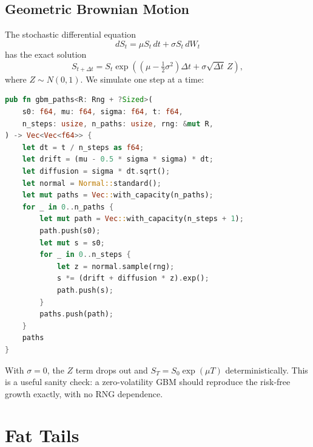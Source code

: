 \subsection{Geometric Brownian Motion}


The stochastic differential equation
\[
dS_t = \mu S_t\, dt + \sigma S_t\, dW_t
\]
has the exact solution
\[
S_{t+\Delta t} = S_t \exp\!\left(\left(\mu - \tfrac{1}{2}\sigma^2\right)\Delta t + \sigma\sqrt{\Delta t}\, Z\right),
\]
where $Z \sim N(0, 1)$. We simulate one step at a time:

\begin{lstlisting}[language=Rust]
pub fn gbm_paths<R: Rng + ?Sized>(
    s0: f64, mu: f64, sigma: f64, t: f64,
    n_steps: usize, n_paths: usize, rng: &mut R,
) -> Vec<Vec<f64>> {
    let dt = t / n_steps as f64;
    let drift = (mu - 0.5 * sigma * sigma) * dt;
    let diffusion = sigma * dt.sqrt();
    let normal = Normal::standard();
    let mut paths = Vec::with_capacity(n_paths);
    for _ in 0..n_paths {
        let mut path = Vec::with_capacity(n_steps + 1);
        path.push(s0);
        let mut s = s0;
        for _ in 0..n_steps {
            let z = normal.sample(rng);
            s *= (drift + diffusion * z).exp();
            path.push(s);
        }
        paths.push(path);
    }
    paths
}
\end{lstlisting}

\begin{keyinsight}
With $\sigma = 0$, the $Z$ term drops out and $S_T = S_0 \exp(\mu T)$
deterministically. This is a useful sanity check: a zero-volatility GBM
should reproduce the risk-free growth exactly, with no RNG dependence.
\end{keyinsight}

\section{Fat Tails}


